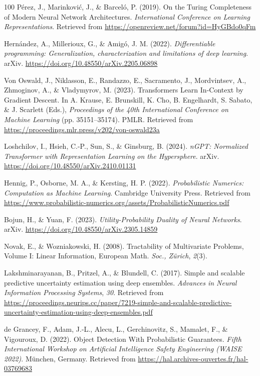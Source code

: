 \documentclass[11pt]{book}
\begin{document}
\begin{thebibliography}{100}
 Pérez, J., Marinković, J., \& Barceló, P. (2019). On the Turing
Completeness of Modern Neural Network Architectures. \emph{International
Conference on Learning Representations}. Retrieved from
\url{https://openreview.net/forum?id=HyGBdo0qFm}

 Hernández, A., Millerioux, G., \& Amigó, J. M. (2022).
\emph{Differentiable programming: Generalization, characterization and
limitations of deep learning}. arXiv.
\url{https://doi.org/10.48550/arXiv.2205.06898}

 Von Oswald, J., Niklasson, E., Randazzo, E., Sacramento, J.,
Mordvintsev, A., Zhmoginov, A., \& Vladymyrov, M. (2023). Transformers
Learn In-Context by Gradient Descent. In A. Krause, E. Brunskill, K.
Cho, B. Engelhardt, S. Sabato, \& J. Scarlett (Eds.), \emph{Proceedings
of the 40th International Conference on Machine Learning} (pp.
35151--35174). PMLR. Retrieved from
\url{https://proceedings.mlr.press/v202/von-oswald23a}

 Loshchilov, I., Hsieh, C.-P., Sun, S., \& Ginsburg, B. (2024).
\emph{nGPT: Normalized Transformer with Representation Learning on the
Hypersphere}. arXiv. \url{https://doi.org/10.48550/arXiv.2410.01131}

 Hennig, P., Osborne, M. A., \& Kersting, H. P. (2022).
\emph{Probabilistic Numerics: Computation as Machine Learning}.
Cambridge University Press. Retrieved from
\url{https://www.probabilistic-numerics.org/assets/ProbabilisticNumerics.pdf}

 Bojun, H., \& Yuan, F. (2023). \emph{Utility-Probability Duality of
Neural Networks}. arXiv. \url{https://doi.org/10.48550/arXiv.2305.14859}

 Novak, E., \& Wozniakowski, H. (2008). Tractability of Multivariate
Problems, Volume I: Linear Information, European Math. \emph{Soc.,
Zürich}, \emph{2}(3).

 Lakshminarayanan, B., Pritzel, A., \& Blundell, C. (2017). Simple and
scalable predictive uncertainty estimation using deep ensembles.
\emph{Advances in Neural Information Processing Systems}, \emph{30}.
Retrieved from
\url{https://proceedings.neurips.cc/paper/7219-simple-and-scalable-predictive-uncertainty-estimation-using-deep-ensembles.pdf}

 de Grancey, F., Adam, J.-L., Alecu, L., Gerchinovitz, S., Mamalet, F.,
\& Vigouroux, D. (2022). Object Detection With Probabilistic Guarantees.
\emph{Fifth International Workshop on Artificial Intelligence Safety
Engineering (WAISE 2022)}. München, Germany. Retrieved from
\url{https://hal.archives-ouvertes.fr/hal-03769683}


\end{thebibliography}
\end{document}
